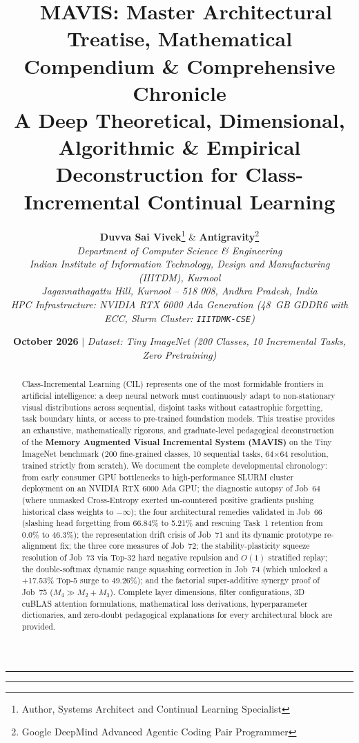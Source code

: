 \documentclass[11pt,a4paper]{article}
\title{\textbf{\LARGE \sffamily 🧠 MAVIS: Master Architectural Treatise, Mathematical Compendium \& Comprehensive Chronicle}\\[0.4em]
\large \sffamily A Deep Theoretical, Dimensional, Algorithmic \& Empirical Deconstruction for Class-Incremental Continual Learning}
\author{
    \textbf{\large Duvva Sai Vivek}\thanks{Author, Systems Architect and Continual Learning Specialist} \quad \& \quad \textbf{\large Antigravity}\thanks{Google DeepMind Advanced Agentic Coding Pair Programmer}\\[0.6em]
    \textit{Department of Computer Science \& Engineering}\\
    \textit{Indian Institute of Information Technology, Design and Manufacturing (IIITDM), Kurnool}\\
    \textit{Jagannathagattu Hill, Kurnool -- 518 008, Andhra Pradesh, India}\\[0.4em]
    \textit{HPC Infrastructure: NVIDIA RTX 6000 Ada Generation (48~GB GDDR6 with ECC, Slurm Cluster: \texttt{IIITDMK-CSE})}
}
\date{\textbf{October 2026} \quad $\vert$ \quad \textit{Dataset: Tiny ImageNet (200 Classes, 10 Incremental Tasks, Zero Pretraining)}}
\begin{document}
\maketitle

\begin{abstract}
Class-Incremental Learning (CIL) represents one of the most formidable frontiers in artificial intelligence: a deep neural network must continuously adapt to non-stationary visual distributions across sequential, disjoint tasks without catastrophic forgetting, task boundary hints, or access to pre-trained foundation models. This treatise provides an exhaustive, mathematically rigorous, and graduate-level pedagogical deconstruction of the \textbf{Memory Augmented Visual Incremental System (MAVIS)} on the Tiny ImageNet benchmark (200 fine-grained classes, 10 sequential tasks, 64$\times$64 resolution, trained strictly from scratch). We document the complete developmental chronology: from early consumer GPU bottlenecks to high-performance SLURM cluster deployment on an NVIDIA RTX 6000 Ada GPU; the diagnostic autopsy of Job~64 (where unmasked Cross-Entropy exerted un-countered positive gradients pushing historical class weights to $-\infty$); the four architectural remedies validated in Job~66 (slashing head forgetting from 66.84\% to 5.21\% and rescuing Task~1 retention from 0.0\% to 46.3\%); the representation drift crisis of Job~71 and its dynamic prototype re-alignment fix; the three core measures of Job~72; the stability-plasticity squeeze resolution of Job~73 via Top-32 hard negative repulsion and $O(1)$ stratified replay; the double-softmax dynamic range squashing correction in Job~74 (which unlocked a +17.53\% Top-5 surge to 49.26\%); and the factorial super-additive synergy proof of Job~75 ($M_4 \gg M_2 + M_3$). Complete layer dimensions, filter configurations, 3D cuBLAS attention formulations, mathematical loss derivations, hyperparameter dictionaries, and zero-doubt pedagogical explanations for every architectural block are provided.
\end{abstract}

\vspace{1em}
\hrule
\vspace{1em}

\tableofcontents

\vspace{1.5em}
\hrule
\vspace{1.5em}

\newpage

\end{document}
